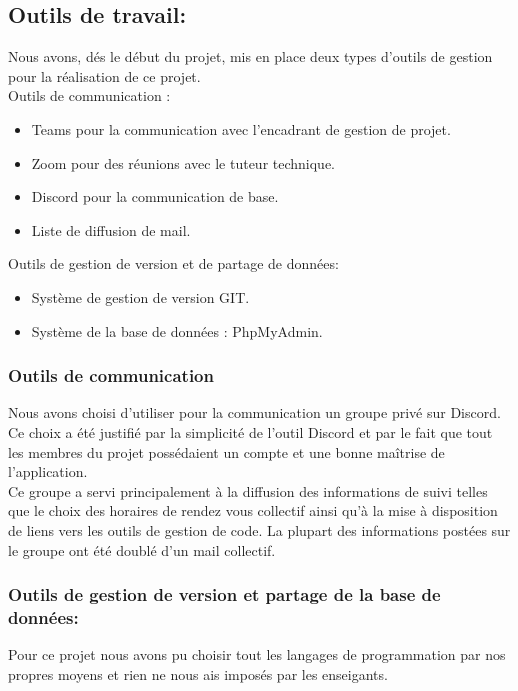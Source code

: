 \documentclass[11pt, report, french]{scrreprt}
\begin{document}
	\subsection{Outils de travail:}
	Nous avons, dés le début du projet, mis en place deux types d’outils de gestion pour la réalisation de ce projet.\\
	
	Outils de communication :\par
	\begin{itemize}
		\item  Teams pour la communication avec l'encadrant de gestion de projet.
		\item  Zoom pour des réunions avec le tuteur technique.
		\item  Discord pour la communication de base.
		\item  Liste de diffusion de mail.
	\end{itemize}
	Outils de gestion de version et de partage de données:\par
	\begin{itemize}
		\item Système de gestion de version GIT.
		\item Système de la base de données : PhpMyAdmin.
	\end{itemize}
	\subsubsection{Outils de communication}
	Nous avons choisi d’utiliser pour la communication un groupe privé sur Discord.\\
	Ce choix a été justifié par la simplicité de l’outil Discord et par le fait que tout les membres du projet possédaient un compte et une bonne maîtrise de l'application.\\
	Ce groupe a servi principalement à la diffusion des informations de suivi
	telles que le choix des horaires de rendez vous collectif ainsi qu’à la mise à disposition de liens vers les outils de gestion de code.
	La plupart des informations postées sur le groupe ont été doublé d’un mail
	collectif.\\
	\subsubsection{Outils de gestion de version et partage de la base de données:}
	Pour ce projet nous avons pu choisir tout les langages de programmation par nos propres moyens et rien ne nous ais imposés par les enseigants.\\
	
\end{document}
